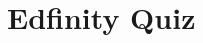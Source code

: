 \documentclass[slidestop,compress,mathserif]{beamer}
\makeatletter
\def\chp3@path{../../Chp 3}
\makeatother
\begin{document}
\section{Edfinity Quiz}















\end{document}
